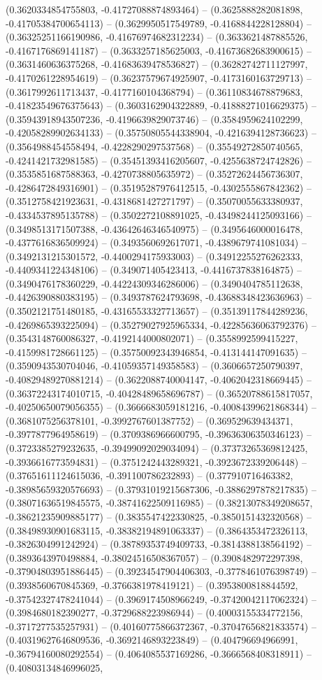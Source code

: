 (0.3620334854755803, -0.41727088874893464) -- (0.3625888282081898, -0.41705384700654113) -- (0.3629950517549789, -0.4168844228128804) -- (0.36325251166190986, -0.41676974682312234) -- (0.3633621487885526, -0.4167176869141187) -- (0.3633257185625003, -0.41673682683900615) -- (0.3631460636375268, -0.41683639478536827) -- (0.36282742711127997, -0.4170261228954619) -- (0.36237579674925907, -0.4173160163729713) -- (0.3617992611713437, -0.4177160104368794) -- (0.36110834678879683, -0.41823549676375643) -- (0.3603162904322889, -0.41888271016629375) -- (0.35943918943507236, -0.4196639829073746) -- (0.3584959624102299, -0.42058289902634133) -- (0.35750805544338904, -0.4216394128736623) -- (0.3564988454558494, -0.4228290297537568) -- (0.35549272850740565, -0.4241421732981585) -- (0.35451393416205607, -0.4255638724742826) -- (0.3535851687588363, -0.4270738805635972) -- (0.35272624456736307, -0.4286472849316901) -- (0.35195287976412515, -0.4302555867842362) -- (0.3512758421923631, -0.4318681427271797) -- (0.35070055633380937, -0.4334537895135788) -- (0.3502272108891025, -0.43498244125093166) -- (0.3498513171507388, -0.43642646346540975) -- (0.3495646000016478, -0.4377616836509924) -- (0.3493560692617071, -0.4389679741081034) -- (0.3492131215301572, -0.4400294175933003) -- (0.34912255276262333, -0.4409341224348106) -- (0.349071405423413, -0.4416737838164875) -- (0.3490476178360229, -0.44224309346286006) -- (0.3490404785112638, -0.4426390880383195) -- (0.3493787624793698, -0.43688348423636963) -- (0.3502121751480185, -0.43165533327713657) -- (0.35139117844289236, -0.4269865393225094) -- (0.35279027925965334, -0.42285636063792376) -- (0.3543148760086327, -0.4192144000802071) -- (0.3558992599415227, -0.4159981728661125) -- (0.35750092343946854, -0.413144147091635) -- (0.3590943530704046, -0.41059357149358583) -- (0.3606657250790397, -0.40829489270881214) -- (0.3622088740004147, -0.4062042318669445) -- (0.36372243174010715, -0.40428489658696787) -- (0.36520788615817057, -0.40250650079056355) -- (0.3666683059181216, -0.40084399621868344) -- (0.3681075256378101, -0.3992767601387752) -- (0.369529639434371, -0.3977877964958619) -- (0.3709386966600795, -0.39636306350346123) -- (0.3723385279232635, -0.39499092029034094) -- (0.37373265369812425, -0.3936616773594831) -- (0.3751242443289321, -0.3923672339206448) -- (0.37651611124615036, -0.391100786232893) -- (0.377910716463382, -0.38985659320576693) -- (0.37931019215687306, -0.3886297878217835) -- (0.38071636519845575, -0.38741622509116985) -- (0.38213078349208657, -0.38621235909885177) -- (0.3835547422330825, -0.3850151432320568) -- (0.38498930901683115, -0.38382194891063337) -- (0.3864353472326113, -0.3826304991242924) -- (0.38789353749409733, -0.3814388138564192) -- (0.3893643970498884, -0.38024516508367057) -- (0.3908482972297398, -0.37904803951886445) -- (0.39234547904406303, -0.3778461076398749) -- (0.3938560670845369, -0.3766381978419121) -- (0.3953800818844592, -0.37542327478241044) -- (0.3969174508966249, -0.37420042117062324) -- (0.3984680182390277, -0.3729688223986944) -- (0.40003155334772156, -0.3717277535257931) -- (0.40160775866372367, -0.37047656821833574) -- (0.40319627646809536, -0.3692146893223849) -- (0.404796694966991, -0.36794160080292554) -- (0.4064085537169286, -0.3666568408318911) -- (0.40803134846996025, 